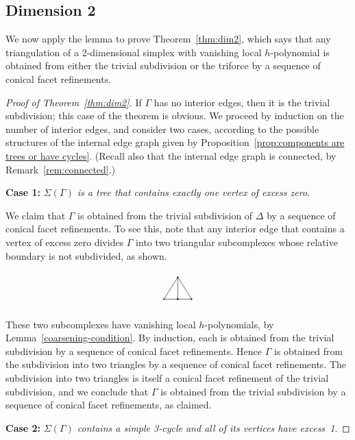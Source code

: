 \documentclass[10pt]{amsart}
\newenvironment{proofsection}[2]{\par\smallskip\noindent\textbf{#1} \emph{#2}.\par\nobreak}{\par\smallskip}
\begin{document}
\subsection{Dimension 2}
We now apply the lemma to prove Theorem~\ref{thm:dim2}, which says that any triangulation of a 2-dimensional simplex with vanishing local $h$-polynomial is obtained from either the trivial subdivision or the triforce by a sequence of conical facet refinements. 

\begin{proof}[Proof of Theorem~\ref{thm:dim2}]
If $\Gamma$ has no interior edges, then it is the trivial subdivision; this case of the theorem is obvious. We proceed by induction on the number of interior edges, and consider two cases, according to the possible structures of the internal edge graph given by Proposition~\ref{prop:components are trees or have cycles}. (Recall also that the internal edge graph is connected, by Remark~\ref{rem:connected}.)
 

\begin{proofsection}{Case 1:}{$\Sigma(\Gamma)$ is a tree that contains exactly one vertex of excess zero} 

We claim that $\Gamma$ is obtained from the trivial subdivision of $\Delta$ by a sequence of conical facet refinements. To see this, note that any interior edge that contains a vertex of excess zero divides $\Gamma$ into two triangular subcomplexes whose relative boundary is not subdivided, as shown.
\[
\begin{tikzpicture}
\filldraw (0,0) circle (.6pt) -- (.5,0) circle (.6pt)-- (1,0)circle (.6pt) -- (.5,.8)circle (.6pt) -- (0,0);
\filldraw (.5,0)circle (.6pt) -- (.5,.8) ;
\node at (.5,-.2) {};
\node at (.5, 1) {};
\end{tikzpicture}
\]
These two subcomplexes have vanishing local $h$-polynomials, by Lemma~\ref{coarsening-condition}. By induction, each is obtained from the trivial subdivision by a sequence of conical facet refinements. Hence $\Gamma$ is obtained from the subdivision into two triangles by a sequence of conical facet refinements. The subdivision into two triangles is itself a conical facet refinement of the trivial subdivision, and we conclude that $\Gamma$ is obtained from the trivial subdivision by a sequence of conical facet refinements, as claimed.
\end{proofsection}

\begin{proofsection}{Case 2:}{$\Sigma(\Gamma)$ contains a simple 3-cycle and all of its vertices have excess~1} 


\end{proofsection}
\end{proof}
\end{document}
